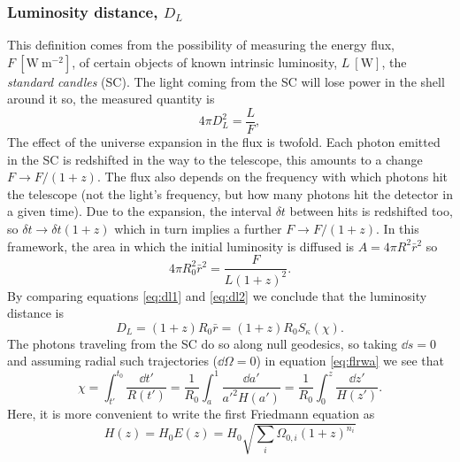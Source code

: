 \documentclass[fleqn, usenatbib]{mnras}
\begin{document}
\subsubsection{Luminosity distance, $D_L$}
This definition comes from the possibility of measuring the energy flux, $F~[\mathrm{W~m^{-2}}]$, of certain objects of known intrinsic luminosity, $L~[\mathrm{W}]$, the \textit{standard candles} (SC). The light coming from the SC will lose power in the shell around it so, the measured quantity is
\begin{equation}
4\pi D_L^2 = \frac{L}{F},
\label{eq:dl1}
\end{equation}
The effect of the universe expansion in the flux is twofold. Each photon emitted in the SC is redshifted in the way to the telescope, this amounts to a change $F\rightarrow F/(1+z)$. The flux also depends on the frequency with which photons hit the telescope (not the light's frequency, but how many photons hit the detector in a given time). Due to the expansion, the interval $\delta t$ between hits is redshifted too, so $\delta t \rightarrow \delta t(1+z)$ which in turn implies a further $F\rightarrow F/(1+z)$. In this framework, the area in which the initial luminosity is diffused is $A = 4\pi R^2\bar{r}^2$ so
\begin{equation}
4\pi R_0^2\bar{r}^2 = \frac{F}{L(1+z)^2}.
\label{eq:dl2}
\end{equation}
By comparing equations \ref{eq:dl1} and \ref{eq:dl2} we conclude that the luminosity distance is
\begin{equation}
D_L = (1+z)R_0\bar{r} = (1+z)R_0S_\kappa(\chi).
\end{equation}
The photons traveling from the SC do so along null geodesics, so taking $\dd s=0$ and assuming radial such trajectories ($\dd \Omega=0$) in equation \ref{eq:flrwa} we see that
\begin{equation}
\chi = \int_{t'}^{t_0}\frac{\dd t'}{R(t')} = \frac{1}{R_0}\int_{a}^{1}\frac{\dd a'}{a'^2H(a')} = \frac{1}{R_0}\int_{0}^{z}\frac{\dd z'}{H(z')}.
\label{eq:chi}
\end{equation}
Here, it is more convenient to write the first Friedmann equation as 
\begin{equation}
H(z) = H_0E(z) = H_0\sqrt{\sum_{i}\Omega_{0,i}(1+z)^{n_i}}
\end{equation}
\end{document}
